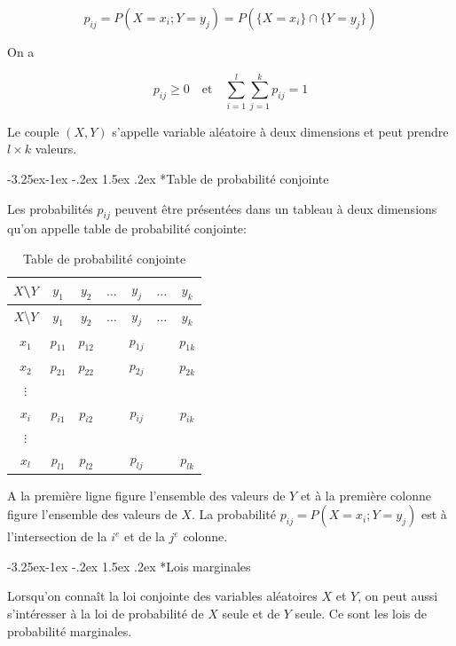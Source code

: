 \documentclass[]{book}
\makeatletter
\renewcommand\subsection{\@startsection{subsection}{2}{\z@}%
                                     {-3.25ex\@plus -1ex \@minus -.2ex}%
                                     {1.5ex \@plus .2ex}%
                                     {\normalfont\large\bfseries\color{Violet}}}
\theoremstyle{magentacolor}
\theoremstyle{proprie}
\theoremstyle{exstyle}
\theoremstyle{exostyle}
\theoremstyle{definition}
\theoremstyle{definition}
\theoremstyle{definition}
\theoremstyle{remark}
\makeatother
\begin{document}
\[p_{ij} = P(X=x_i;Y=y_j) = P(\{X=x_i\}\cap\{Y=y_j\})\]

On a

\[p_{ij} \geq 0 \quad \text{et} \quad \sum_{i=1}^{l} \sum_{j=1}^{k} p_{ij} = 1\]

Le couple \((X,Y)\) s'appelle variable aléatoire à deux dimensions et peut
prendre \(l\times k\) valeurs.

\hypertarget{table-de-probabilite-conjointe}{%
\subsection*{Table de probabilité conjointe}\label{table-de-probabilite-conjointe}}

Les probabilités \(p_{ij}\) peuvent être présentées dans un tableau à deux
dimensions qu'on appelle table de probabilité conjointe:

\begin{longtable}[]{@{}ccccccc@{}}
\caption{Table de probabilité conjointe}\tabularnewline
\toprule
\(X\)\textbackslash{}\(Y\) & \(y_1\) & \(y_2\) & \(\ldots\) & \(y_j\) & \(\ldots\) & \(y_k\)\tabularnewline
\midrule
\endfirsthead
\toprule
\(X\)\textbackslash{}\(Y\) & \(y_1\) & \(y_2\) & \(\ldots\) & \(y_j\) & \(\ldots\) & \(y_k\)\tabularnewline
\midrule
\endhead
\(x_1\) & \(p_{11}\) & \(p_{12}\) & & \(p_{1j}\) & & \(p_{1k}\)\tabularnewline
\(x_2\) & \(p_{21}\) & \(p_{22}\) & & \(p_{2j}\) & & \(p_{2k}\)\tabularnewline
\(\vdots\) & & & & & &\tabularnewline
\(x_i\) & \(p_{i1}\) & \(p_{i2}\) & & \(p_{ij}\) & & \(p_{ik}\)\tabularnewline
\(\vdots\) & & & & & &\tabularnewline
\(x_l\) & \(p_{l1}\) & \(p_{l2}\) & & \(p_{lj}\) & & \(p_{lk}\)\tabularnewline
\bottomrule
\end{longtable}

A la première ligne figure l'ensemble des valeurs de \(Y\) et à la
première colonne figure l'ensemble des valeurs de \(X\). La probabilité
\(p_{ij} = P(X=x_i;Y=y_j)\) est à l'intersection de la \(i^{e}\) et de la
\(j^{e}\) colonne.

\hypertarget{lois-marginales}{%
\subsection*{Lois marginales}\label{lois-marginales}}

Lorsqu'on connaît la loi conjointe des variables aléatoires \(X\) et \(Y\),
on peut aussi s'intéresser à la loi de probabilité de \(X\) seule et de
\(Y\) seule. Ce sont les lois de probabilité marginales.
\end{document}
